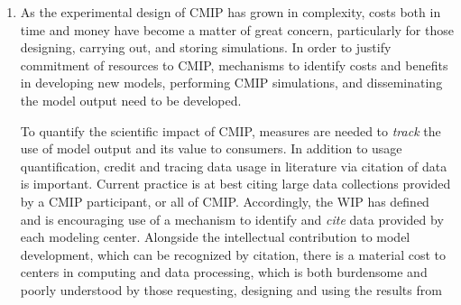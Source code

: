 \documentclass[gmd,manuscript]{copernicus}
\newcommand{\pllabel}[1]{\label{p-#1}\linelabel{l-#1}}
\newcommand{\urlref}[2] {\href{#1}{#2}\footnote{\url{#1}, retrieved \today.}}
\begin{document}
\begin{enumerate}
  \pllabel{SC1-1}
  In addition, there is an increased interest in climate analytics as
  a service \citep{ref:balajietal2011,ref:schnaseetal2017}. This
  follows the principle of placing analysis close to the data. Some centres
  plan to add resources that combine archival and analysis
  capabilities (e.g., NCAR's \urlref{https://goo.gl/sYTxC2}{CMIP
    Analysis Platform}). There are also new efforts to bring climate
  data storage and analysis to the cloud era
  \citep[e.g][]{ref:duffyetal2015}. Platforms such as
  \href{http://pangeo-data.org/}{Pangeo} show much promise in this
  realm, and widespread experimentation and adoption is encouraged.
\item As the experimental design of CMIP has grown in complexity,
  costs both in time and money have become a matter of great concern,
  particularly for those designing, carrying out, and storing
  simulations. In order to justify commitment of resources to CMIP,
  mechanisms to identify costs and benefits in developing new models,
  performing CMIP simulations, and disseminating the model output need
  to be developed.

  To quantify the scientific impact of CMIP, measures are needed to
  \emph{track} the use of model output and its value to consumers. In
  addition to usage quantification, credit and tracing data usage in
  literature via citation of data is important. Current practice is at
  best citing large data collections provided by a CMIP participant,
  or all of CMIP. Accordingly, the WIP has defined and is encouraging
  use of a mechanism to identify and \emph{cite} data provided by each
  modeling center. Alongside the intellectual contribution to model
  development, which can be recognized by citation, there is a
  material cost to centers in computing and data processing, which is
  both burdensome
  \pllabel{RC1-11}
  and poorly understood by those requesting, designing and using the
  results from
  \pllabel{RC1-12}


\end{enumerate}
\end{document}

